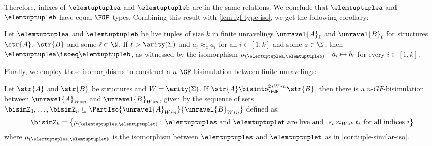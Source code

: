 Therefore, infixes of $\elemtuptuplea$ and $\elemtuptupleb$ are in the same relations.
We conclude that $\elemtuptuplea$ and $\elemtuptupleb$ have equal $\FGF$-types.
Combining this result with \cref{lem:fgf-type-iso}, we get the following corollary:
\begin{corollary}\label{cor:tuple-similar-iso}
  Let $\elemtuptuplea$ and $\elemtuptupleb$ be live tuples of size $k$ in finite unravelings $\unravel{A}_{\ell}$ and $\unravel{B}_{\ell}$ for structures $\str{A}$, $\str{B}$ and some $\ell \in \N$.
  If $\ell > \arity(\Sigma)$ and $a_{i} \approx_{z} a_{i}$ for all $i \in [1,k]$ and some $z \in \N$, then $\elemtuptuplea \isoeq \elemtuptupleb$, as witnessed by the isomorphism $\mu_{(\elemtuptuplea, \elemtuptupleb)}:\, a_{i} \mapsto b_{i}$ for every $i \in [1, k]$.
\end{corollary}
Finally, we employ these isomorphisms to construct a $n$-$\GF$-bisimulation between finite unravelings:
\begin{lemma}\label{lem:finite-unravel-gf-bisim}
  Let $\str{A}$ and $\str{B}$ be structures and $W = \arity(\Sigma)$.
  If $\str{A} \bisimto_{\FGF}^{2 * W * n} \str{B}$, then there is a $n$-$GF$-bisimulation between $\unravel{A}_{W * n}$ and $\unravel{B}_{W * n}$, given by the sequence of sets $\bisimZ_{0}, \ldots, \bisimZ_{n} \subseteq \PartIso{\unravel{A}_{W * n}}{\unravel{B}_{W * n}}$ defined as:
  \begin{equation*}
    \bisimZ_{k} = \left\{
      \mu_{(\elemtuptuples, \elemtuptuplet)}:\,
      \elemtuptuples\ \text{and}\ \elemtuptuplet\ \text{are live and}\ \
      s_{i} \approx_{W * k} t_{i}\ \text{for all indices $i$}
    \right\}
  \end{equation*}
  where $\mu_{(\elemtuptuples, \elemtuptuplet)}$ is the isomorphism between $\elemtuptuples$ and $\elemtuptuplet$ as in \cref{cor:tuple-similar-iso}.
\end{lemma}
